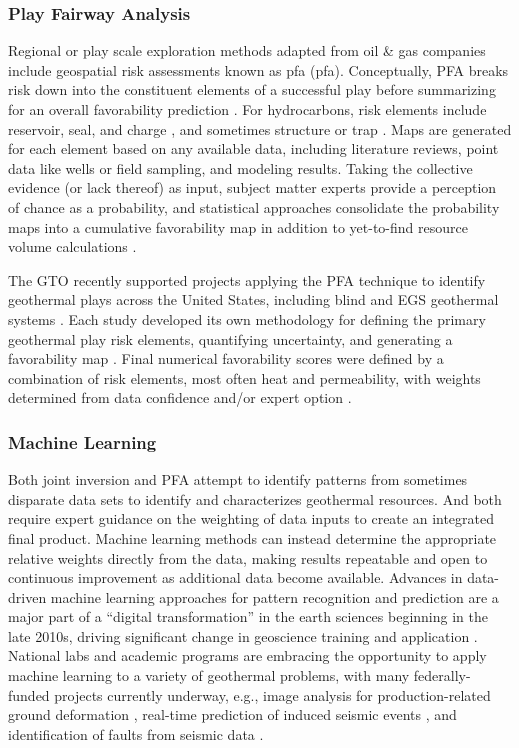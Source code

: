 \subsubsection{Play Fairway Analysis}\label{ch2:pfa}
Regional or play scale exploration methods adapted from oil \& gas companies include geospatial risk assessments known as \acrlong{pfa} (\acrshort{pfa}). Conceptually, PFA breaks risk down into the constituent elements of a successful play before summarizing for an overall favorability prediction \citep{garchar_geothermal_2016}. For hydrocarbons, risk elements include reservoir, seal, and charge \citep{fraser_regional_2010}, and sometimes structure or trap \citep{doust_exploration_2010}. Maps are generated for each element based on any available data, including literature reviews, point data like wells or field sampling, and modeling results. Taking the collective evidence (or lack thereof) as input, subject matter experts provide a perception of chance as a probability, and statistical approaches consolidate the probability maps into a cumulative favorability map in addition to yet-to-find resource volume calculations \citep{lottaroli_evaluating_2018}.

The GTO recently supported projects applying the PFA technique to identify geothermal plays across the United States, including blind and EGS geothermal systems \citep{eeri_play_2014}. Each study developed its own methodology for defining the primary geothermal play risk elements, quantifying uncertainty, and generating a favorability map \citep{faulds_discovering_2019, jordan_low_2016, nash_phase_2017, wannamaker_structurally_2016}. Final numerical favorability scores were defined by a combination of risk elements, most often heat and permeability, with weights determined from data confidence and/or expert option \citep{garchar_geothermal_2016}.

\subsubsection{Machine Learning}\label{ch2:machine_learning}
Both joint inversion and PFA attempt to identify patterns from sometimes disparate data sets to identify and characterizes geothermal resources. And both require expert guidance on the weighting of data inputs to create an integrated final product. Machine learning methods can instead determine the appropriate relative weights directly from the data, making results repeatable and open to continuous improvement as additional data become available. Advances in data-driven machine learning approaches for pattern recognition and prediction are a major part of a ``digital transformation'' in the earth sciences beginning in the late 2010s, driving significant change in geoscience training and application \citep{gunderson_recent_2020}. National labs and academic programs are embracing the opportunity to apply machine learning to a variety of geothermal problems, with many federally-funded projects currently underway, e.g., image analysis for production-related ground deformation \citep{cavur_dinsar_2021}, real-time prediction of induced seismic events \citep{small_theory_2019}, and identification of faults from seismic data \citep{gao_delineating_2021}.

